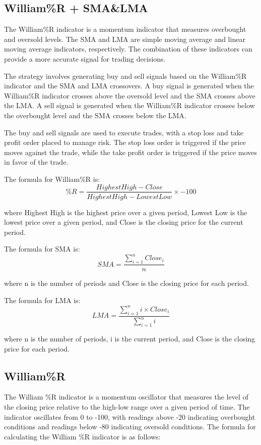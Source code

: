 \subsection{William\%R + SMA&LMA}
The William\%R indicator is a momentum indicator that measures overbought and oversold levels. The SMA and LMA are simple moving average and linear moving average indicators, respectively. The combination of these indicators can provide a more accurate signal for trading decisions.

The strategy involves generating buy and sell signals based on the William\%R indicator and the SMA and LMA crossovers. A buy signal is generated when the William\%R indicator crosses above the oversold level and the SMA crosses above the LMA. A sell signal is generated when the William\%R indicator crosses below the overbought level and the SMA crosses below the LMA.

The buy and sell signals are used to execute trades, with a stop loss and take profit order placed to manage risk. The stop loss order is triggered if the price moves against the trade, while the take profit order is triggered if the price moves in favor of the trade.

The formula for William\%R is:
\begin{equation}
\%R = \frac{Highest High - Close}{Highest High - Lowest Low} \times -100
\end{equation}

where Highest High is the highest price over a given period, Lowest Low is the lowest price over a given period, and Close is the closing price for the current period.

The formula for SMA is:
\begin{equation}
SMA = \frac{\sum_{i=1}^{n}Close_{i}}{n}
\end{equation}

where n is the number of periods and Close is the closing price for each period.

The formula for LMA is:
\begin{equation}
LMA = \frac{\sum_{i=1}^{n}i \times Close_{i}}{\sum_{i=1}^{n}i}
\end{equation}

where n is the number of periods, i is the current period, and Close is the closing price for each period.

\subsection{William\%R}
The William \%R indicator is a momentum oscillator that measures the level of the closing price relative to the high-low range over a given period of time. The indicator oscillates from 0 to -100, with readings above -20 indicating overbought conditions and readings below -80 indicating oversold conditions. The formula for calculating the William \%R indicator is as follows:

